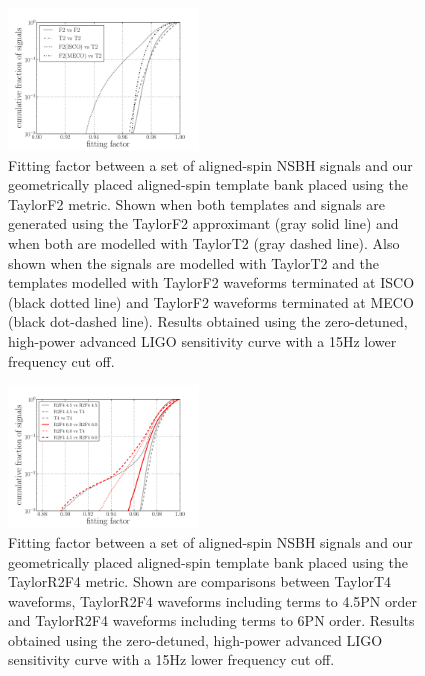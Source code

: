 \begin{figure}
\begin{center}
\includegraphics[width=0.45\textwidth]
{papers/nsbh_effectualness/figure3.pdf}
\end{center}
\caption{\label{fig:bankF2verification}
Fitting factor between a set of aligned-spin \ac{NSBH} signals and our
geometrically placed aligned-spin template bank placed using the TaylorF2
metric. Shown when both templates and signals are generated using
the TaylorF2 approximant (gray solid line) and when both are modelled with
TaylorT2 (gray
dashed line). Also shown when the signals are modelled with TaylorT2 and the
templates modelled
with TaylorF2 waveforms terminated at ISCO (black dotted line) and TaylorF2
waveforms terminated at MECO (black dot-dashed line). Results obtained
using the zero-detuned, high-power advanced LIGO sensitivity curve with a 15Hz
lower frequency cut off.
}
\end{figure}

\begin{figure}
\begin{center}
\includegraphics[width=0.45\textwidth]
{papers/nsbh_effectualness/figure4.pdf}
\end{center}
\caption{\label{fig:bankF4verification}
Fitting factor between a set of aligned-spin \ac{NSBH} signals and our
geometrically placed aligned-spin template bank placed using the TaylorR2F4
metric. Shown are comparisons between
TaylorT4 waveforms, TaylorR2F4 waveforms
including terms to 4.5PN order and TaylorR2F4 waveforms including terms to 6PN
order. Results obtained
using the zero-detuned, high-power advanced LIGO sensitivity curve with a 15Hz
lower frequency cut off.
}
\end{figure}

